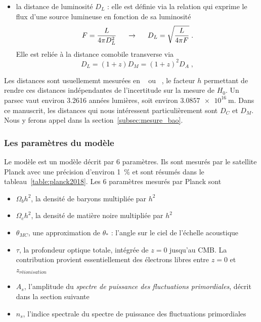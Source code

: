 \begin{itemize}[label=$\bullet$]
\item la distance de luminosité $D_L$ : elle est définie via la relation qui exprime le flux d'une source lumineuse en fonction de sa luminosité
  \begin{equation}
    \label{eq:dist_lum}
    F = \frac{L}{4\pi D_L^2} \hspace{0.5cm} \rightarrow \hspace{0.5cm} D_L = \sqrt{\frac{L}{4 \pi F}}  \; .
  \end{equation}
  Elle est reliée à la distance comobile transverse via
  \begin{equation}
    D_L = (1+z) D_M = (1+z)^2 D_A  \; ,
  \end{equation}
\end{itemize}

Les distances sont usuellememt mesurées en \si{\perh\kpc} ou \si{\perh\Mpc}, le facteur $h$ permettant de rendre ces distances indépendantes de l'incertitude sur la mesure de $H_{0}$. Un parsec vaut environ \num{3.2616} années lumières, soit environ $\SI{3,0857 e16}{\meter}$.
Dans ce manuscrit, les distances qui nous intéressent particulièrement sont $D_C$ et $D_M$. Nous y ferons appel dans la section~\ref{subsec:mesure_bao}.

\subsubsection{Les paramètres du modèle} 
Le modèle \lcdm{} est un modèle décrit par 6 paramètres. Ils sont mesurés par le satellite Planck \autocite{Collaboration2018} avec une précision d'environ 1~\% et sont résumés dans le tableau~\ref{table:planck2018}. Les 6 paramètres mesurés par Planck sont
\begin{itemize}
\item $\Omega_bh^2$, la densité de baryons multipliée par $h^2$
\item $\Omega_ch^2$, la densité de matière noire multipliée par $h^2$
\item $\theta_{MC}$, une approximation de $\theta_*$ : l'angle sur le ciel de l'échelle acoustique
\item $\tau$, la profondeur optique totale, intégrée de $z=0$ jusqu'au CMB. La contribution provient essentiellement des électrons libres entre $z = 0$ et $z_{réionisation}$
\item $A_s$, l'amplitude du \emph{spectre de puissance des fluctuations primordiales}, décrit dans la section suivante
\item $n_s$, l'indice spectrale du spectre de puissance des fluctuations primordiales
\end{itemize}



